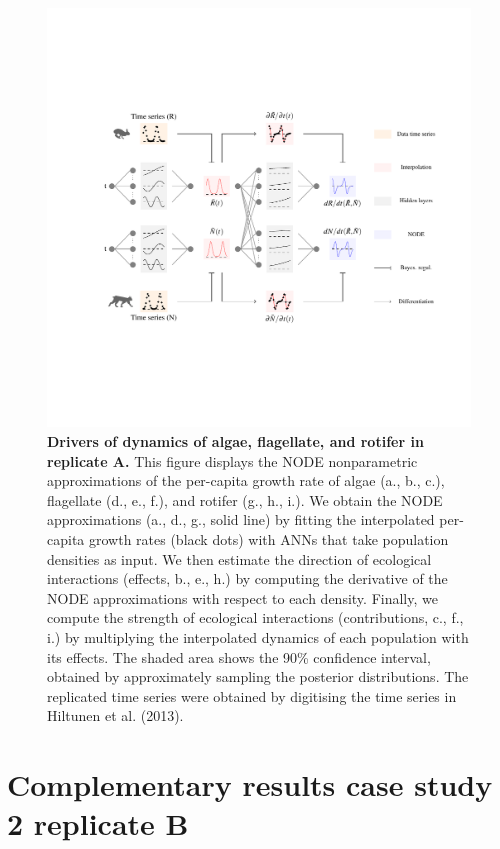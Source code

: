 \documentclass[11pt, oneside]{article}
\begin{document}
\newpage
\begin{figure}[H]
\includegraphics[width=1\linewidth,page=9]{figures/main.pdf}
\caption{
    \textbf{Drivers of dynamics of algae, flagellate, and rotifer in replicate A.}
    This figure displays the NODE nonparametric approximations of the per-capita growth rate of algae (a., b., c.), flagellate (d., e., f.), and rotifer (g., h., i.).
    We obtain the NODE approximations (a., d., g., solid line) by fitting the interpolated per-capita growth rates (black dots) with ANNs that take population densities as input.
    We then estimate the direction of ecological interactions (effects, b., e., h.) by computing the derivative of the NODE approximations with respect to each density.
    Finally, we compute the strength of ecological interactions (contributions, c., f., i.) by multiplying the interpolated dynamics of each population with its effects.
    The shaded area shows the 90\% confidence interval, obtained by approximately sampling the posterior distributions. 
    The replicated time series were obtained by digitising the time series in Hiltunen et al. (2013).
}
\end{figure}
\newpage

\newpage
\section{Complementary results case study 2 replicate B}
\end{document}
